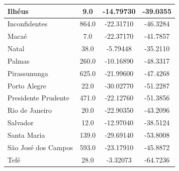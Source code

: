 \begin{table}
\begin{tabular}{|l|c|c|c|}
Ilhéus              &              9.0 &       -14.79730 &        -39.0355 \\ \hline
Inconfidentes       &            864.0 &       -22.31710 &        -46.3284 \\ \hline
Macaé               &              7.0 &       -22.37170 &        -41.7857 \\ \hline
Natal               &             38.0 &        -5.79448 &        -35.2110 \\ \hline
Palmas              &            260.0 &       -10.16890 &        -48.3317 \\ \hline
Pirassununga        &            625.0 &       -21.99600 &        -47.4268 \\ \hline
Porto Alegre        &             22.0 &       -30.02770 &        -51.2287 \\ \hline
Presidente Prudente &            471.0 &       -22.12760 &        -51.3856 \\ \hline
Rio de Janeiro      &             20.0 &       -22.90350 &        -43.2096 \\ \hline
Salvador            &             12.0 &       -12.97040 &        -38.5124 \\ \hline
Santa Maria         &            139.0 &       -29.69140 &        -53.8008 \\ \hline
São José dos Campos &            593.0 &       -23.17910 &        -45.8872 \\ \hline
Tefé                &             28.0 &        -3.32073 &        -64.7236 \\ \hline
\end{tabular}
\label{tab:stations}
\end{table}


